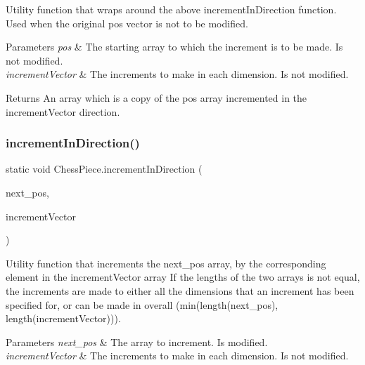 Utility function that wraps around the above \textquotesingle{}increment\+In\+Direction\textquotesingle{} function. Used when the original \textquotesingle{}pos\textquotesingle{} vector is not to be modified. 
\begin{DoxyParams}{Parameters}
{\em pos} & The starting array to which the increment is to be made. Is not modified. \\
\hline
{\em increment\+Vector} & The increments to make in each dimension. Is not modified. \\
\hline
\end{DoxyParams}
\begin{DoxyReturn}{Returns}
An array which is a copy of the \textquotesingle{}pos\textquotesingle{} array incremented in the \textquotesingle{}increment\+Vector\textquotesingle{} direction. 
\end{DoxyReturn}
\mbox{\label{class_chess_piece_afc4c8e0066a968f0156857f0e8003a10}} 
\subsubsection{\texorpdfstring{increment\+In\+Direction()}{incrementInDirection()}}
{\footnotesize\ttfamily static void Chess\+Piece.\+increment\+In\+Direction (\begin{DoxyParamCaption}\item[{@Not\+Null int \mbox{[}$\,$\mbox{]}}]{next\+\_\+pos,  }\item[{@Not\+Null int \mbox{[}$\,$\mbox{]}}]{increment\+Vector }\end{DoxyParamCaption})\hspace{0.3cm}{\ttfamily [static]}}

Utility function that increments the \textquotesingle{}next\+\_\+pos\textquotesingle{} array, by the corresponding element in the \textquotesingle{}increment\+Vector\textquotesingle{} array If the lengths of the two arrays is not equal, the increments are made to either all the dimensions that an increment has been specified for, or can be made in overall (min(length(next\+\_\+pos), length(increment\+Vector))). 
\begin{DoxyParams}{Parameters}
{\em next\+\_\+pos} & The array to increment. Is modified. \\
\hline
{\em increment\+Vector} & The increments to make in each dimension. Is not modified. \\
\hline
\end{DoxyParams}
\mbox{\label{class_chess_piece_aaa1739b07a9669275d38dab803d1c68f}} 
